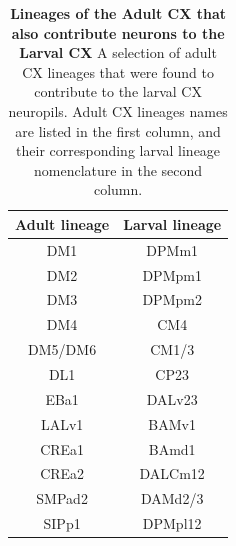         \begin{table} [H]
        \centering
        \begin{tabular}{|c|c|}
        \hline
        Adult lineage & Larval lineage \\
        \hline
        DM1 & DPMm1 \\
        DM2 & DPMpm1 \\
        DM3 & DPMpm2 \\
        DM4 & CM4 \\
        DM5/DM6 & CM1/3 \\
        DL1 & CP23 \\
        EBa1 & DALv23 \\
        LALv1 & BAMv1 \\
        CREa1 & BAmd1 \\
        CREa2 & DALCm12 \\
        SMPad2 & DAMd2/3 \\
        SIPp1 & DPMpl12 \\
        \bottomrule
        \end{tabular}
        \caption[Lineages of the Adult CX that also contribute neurons to the Larval CX]{\textbf{Lineages of the Adult CX that also contribute neurons to the Larval CX} A selection of adult CX lineages that were found to contribute to the larval CX neuropils.  Adult CX lineages names are listed in the first column, and their corresponding larval lineage nomenclature in the second column\citep{eckstein2024neurotransmitter}.}
        \label{lineagemap}
        \end{table}
